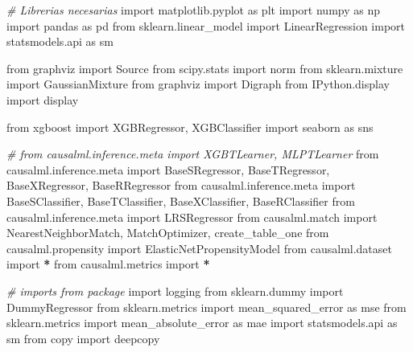 \documentclass[
  a4paper,
  DIV=11,
  numbers=noendperiod]{scrreprt}
\newenvironment{Shaded}{\begin{snugshade}}{\end{snugshade}}
\newcommand{\CommentTok}[1]{\textcolor[rgb]{0.56,0.35,0.01}{\textit{#1}}}
\newcommand{\ImportTok}[1]{#1}
\newcommand{\NormalTok}[1]{#1}
\newcommand{\OperatorTok}[1]{\textcolor[rgb]{0.81,0.36,0.00}{\textbf{#1}}}
\begin{document}
\begin{Shaded}
\begin{Highlighting}[numbers=left,,]
\CommentTok{\# Librerias necesarias}
\ImportTok{import}\NormalTok{ matplotlib.pyplot }\ImportTok{as}\NormalTok{ plt}
\ImportTok{import}\NormalTok{ numpy }\ImportTok{as}\NormalTok{ np}
\ImportTok{import}\NormalTok{ pandas }\ImportTok{as}\NormalTok{ pd}
\ImportTok{from}\NormalTok{ sklearn.linear\_model }\ImportTok{import}\NormalTok{ LinearRegression}
\ImportTok{import}\NormalTok{ statsmodels.api }\ImportTok{as}\NormalTok{ sm}

\ImportTok{from}\NormalTok{ graphviz }\ImportTok{import}\NormalTok{ Source}
\ImportTok{from}\NormalTok{ scipy.stats }\ImportTok{import}\NormalTok{ norm}
\ImportTok{from}\NormalTok{ sklearn.mixture }\ImportTok{import}\NormalTok{ GaussianMixture}
\ImportTok{from}\NormalTok{ graphviz }\ImportTok{import}\NormalTok{ Digraph}
\ImportTok{from}\NormalTok{ IPython.display }\ImportTok{import}\NormalTok{ display}


\ImportTok{from}\NormalTok{ xgboost }\ImportTok{import}\NormalTok{ XGBRegressor, XGBClassifier}
\ImportTok{import}\NormalTok{ seaborn }\ImportTok{as}\NormalTok{ sns}

\CommentTok{\# from causalml.inference.meta import XGBTLearner, MLPTLearner}
\ImportTok{from}\NormalTok{ causalml.inference.meta }\ImportTok{import}\NormalTok{ BaseSRegressor, BaseTRegressor, BaseXRegressor, BaseRRegressor}
\ImportTok{from}\NormalTok{ causalml.inference.meta }\ImportTok{import}\NormalTok{ BaseSClassifier, BaseTClassifier, BaseXClassifier, BaseRClassifier}
\ImportTok{from}\NormalTok{ causalml.inference.meta }\ImportTok{import}\NormalTok{ LRSRegressor}
\ImportTok{from}\NormalTok{ causalml.match }\ImportTok{import}\NormalTok{ NearestNeighborMatch, MatchOptimizer, create\_table\_one}
\ImportTok{from}\NormalTok{ causalml.propensity }\ImportTok{import}\NormalTok{ ElasticNetPropensityModel}
\ImportTok{from}\NormalTok{ causalml.dataset }\ImportTok{import} \OperatorTok{*}
\ImportTok{from}\NormalTok{ causalml.metrics }\ImportTok{import} \OperatorTok{*}


\CommentTok{\# imports from package}
\ImportTok{import}\NormalTok{ logging}
\ImportTok{from}\NormalTok{ sklearn.dummy }\ImportTok{import}\NormalTok{ DummyRegressor}
\ImportTok{from}\NormalTok{ sklearn.metrics }\ImportTok{import}\NormalTok{ mean\_squared\_error }\ImportTok{as}\NormalTok{ mse}
\ImportTok{from}\NormalTok{ sklearn.metrics }\ImportTok{import}\NormalTok{ mean\_absolute\_error }\ImportTok{as}\NormalTok{ mae}
\ImportTok{import}\NormalTok{ statsmodels.api }\ImportTok{as}\NormalTok{ sm}
\ImportTok{from}\NormalTok{ copy }\ImportTok{import}\NormalTok{ deepcopy}
\end{Highlighting}
\end{Shaded}
\end{document}
